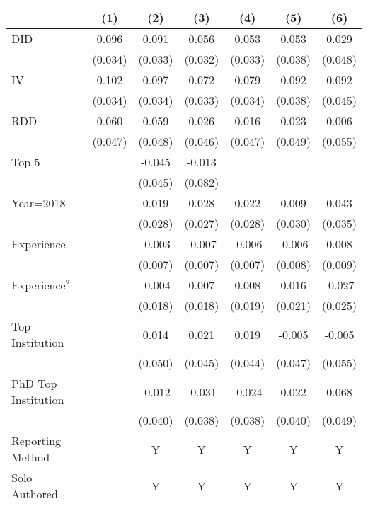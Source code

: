 \begin{tabular}{l*{6}{c}}
\hline\hline
                &\multicolumn{1}{c}{(1)}&\multicolumn{1}{c}{(2)}&\multicolumn{1}{c}{(3)}&\multicolumn{1}{c}{(4)}&\multicolumn{1}{c}{(5)}&\multicolumn{1}{c}{(6)}\\
\hline
DID             &    0.096&    0.091&    0.056&    0.053&    0.053&    0.029\\
                &  (0.034)&  (0.033)&  (0.032)&  (0.033)&  (0.038)&  (0.048)\\
IV              &    0.102&    0.097&    0.072&    0.079&    0.092&    0.092\\
                &  (0.034)&  (0.034)&  (0.033)&  (0.034)&  (0.038)&  (0.045)\\
RDD             &    0.060&    0.059&    0.026&    0.016&    0.023&    0.006\\
                &  (0.047)&  (0.048)&  (0.046)&  (0.047)&  (0.049)&  (0.055)\\
Top 5           &         &   -0.045&   -0.013&         &         &         \\
                &         &  (0.045)&  (0.082)&         &         &         \\
Year=2018       &         &    0.019&    0.028&    0.022&    0.009&    0.043\\
                &         &  (0.028)&  (0.027)&  (0.028)&  (0.030)&  (0.035)\\
Experience      &         &   -0.003&   -0.007&   -0.006&   -0.006&    0.008\\
                &         &  (0.007)&  (0.007)&  (0.007)&  (0.008)&  (0.009)\\
Experience$^2$  &         &   -0.004&    0.007&    0.008&    0.016&   -0.027\\
                &         &  (0.018)&  (0.018)&  (0.019)&  (0.021)&  (0.025)\\
Top Institution &         &    0.014&    0.021&    0.019&   -0.005&   -0.005\\
                &         &  (0.050)&  (0.045)&  (0.044)&  (0.047)&  (0.055)\\
PhD Top Institution&         &   -0.012&   -0.031&   -0.024&    0.022&    0.068\\
                &         &  (0.040)&  (0.038)&  (0.038)&  (0.040)&  (0.049)\\
Reporting Method &         &        Y&        Y&        Y&        Y&        Y\\
Solo Authored   &         &        Y&        Y&        Y&        Y&        Y\\

\end{tabular}
